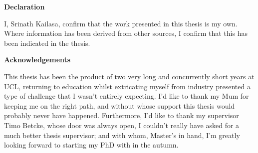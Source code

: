 \thispagestyle{plain}

\begin{center}
    \textbf{Declaration}
\end{center}
I, Srinath Kailasa, confirm that the work presented in this thesis is my own. Where information has been derived from other
sources, I confirm that this has been indicated in the thesis.


\begin{center}
    \textbf{Acknowledgements}
\end{center}

This thesis has been the product of two very long and concurrently short years
at UCL, returning to education whilst extricating myself from industry presented a type of
challenge that I wasn't entirely expecting. I'd like to thank my Mum for keeping
me on the right path, and without whose support this thesis would probably never
have happened. Furthermore, I'd like to thank my supervisor Timo Betcke, whose door
was always open, I couldn't really have asked for a much better thesis supervisor;
and with whom, Master's in hand, I'm greatly looking forward to starting my PhD
with in the autumn.
